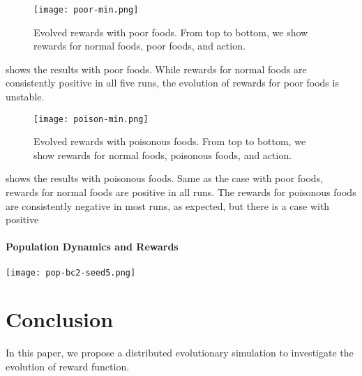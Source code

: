 \begin{figure}[ht]
  \centering
  \texttt{[image: poor-min.png]}
  \caption{
    Evolved rewards with poor foods.
    From top to bottom, we show rewards for normal foods, poor foods, and action.
  }\label{figure:result-poor}
\end{figure}

 shows the results with poor foods. While rewards for normal foods are consistently positive in all five runs, the evolution of rewards for poor foods is unstable.

\begin{figure}[ht]
  \centering
  \texttt{[image: poison-min.png]}
  \caption{
    Evolved rewards with poisonous foods.
    From top to bottom, we show rewards for normal foods, poisonous foods, and action.
  }\label{figure:result-poison}
\end{figure}

 shows the results with poisonous foods. Same as the case with poor foods, rewards for normal foods are positive in all runs. The rewards for poisonous foods are consistently negative in most runs, as expected, but there is a case with positive


\paragraph{Population Dynamics and Rewards}
\begin{figure*}[t]
  \centering
  \texttt{[image: pop-bc2-seed5.png]}
  \caption{}\label{figure:result-population}
\end{figure*}

\section{Conclusion}
In this paper, we propose a distributed evolutionary simulation to investigate the evolution of reward function.